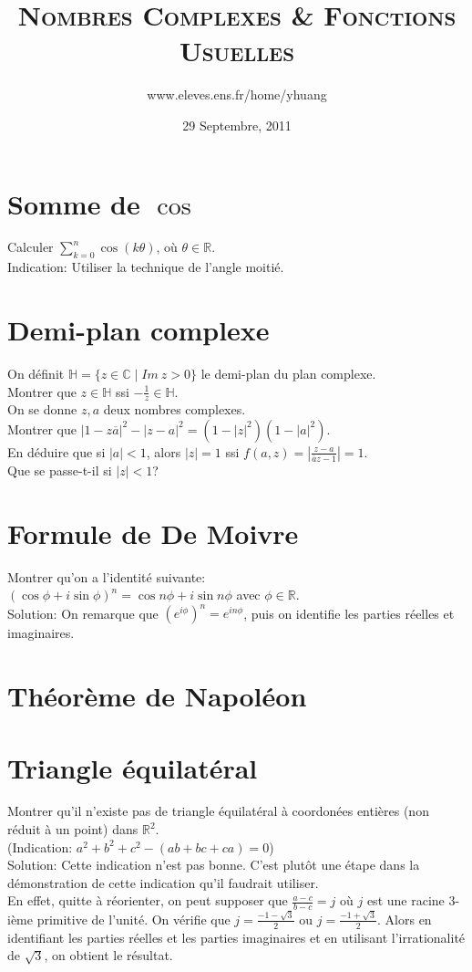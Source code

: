 \documentclass{article}
\begin{document}
\title{\textsc{Nombres Complexes \& Fonctions Usuelles}}
\author{www.eleves.ens.fr/home/yhuang}
\date{29 Septembre, 2011}

\maketitle

\section{Somme de $\cos$}
Calculer $\sum\limits_{k=0}^{n}\cos(k\theta)$, o\`u $\theta\in\mathbb{R}$.\\
Indication: Utiliser la technique de l'angle moiti\'e.

\section{Demi-plan complexe}
On d\'efinit $\mathbb{H}=\{z\in\mathbb{C}\mid Im~z>0\}$ le demi-plan du plan complexe.\\
Montrer que $z\in\mathbb{H}$ ssi $-\frac{1}{z}\in\mathbb{H}$.\\
On se donne $z,a$ deux nombres complexes.\\
Montrer que $|1-z\overline{a}|^2-|z-a|^2=(1-|z|^2)(1-|a|^2)$.\\
En d\'eduire que si $|a|<1$, alors $|z|=1$ ssi $f(a,z)=|\frac{z-a}{\overline{a}z-1}|=1$.\\
Que se passe-t-il si $|z|<1$?

\section{Formule de De Moivre}
Montrer qu'on a l'identit\'e suivante:\\
$(\cos\phi+i\sin\phi)^n=\cos n\phi+i\sin n\phi$ avec $\phi\in\mathbb{R}$.\\
Solution: On remarque que $(e^{i\phi})^n=e^{in\phi}$, puis on identifie les parties r\'eelles et imaginaires.

\section{Th\'eor\`eme de Napol\'eon}

\section{Triangle \'equilat\'eral}
Montrer qu'il n'existe pas de triangle \'equilat\'eral \`a coordon\'ees enti\`eres (non r\'eduit \`a un point) dans $\mathbb{R}^2$.\\
(Indication: $a^2+b^2+c^2-(ab+bc+ca)=0$)\\
Solution: Cette indication n'est pas bonne. C'est plut\^ot une \'etape dans la d\'emonstration de cette indication qu'il faudrait utiliser.\\
En effet, quitte \`a r\'eorienter, on peut supposer que $\frac{a-c}{b-c}=j$ o\`u $j$ est une racine $3$-i\`eme primitive de l'unit\'e. On v\'erifie que $j=\frac{-1-\sqrt{3}}{2}$ ou $j=\frac{-1+\sqrt{3}}{2}$. Alors en identifiant les parties r\'eelles et les parties imaginaires et en utilisant l'irrationalit\'e de $\sqrt{3}$, on obtient le r\'esultat.
\end{document}
